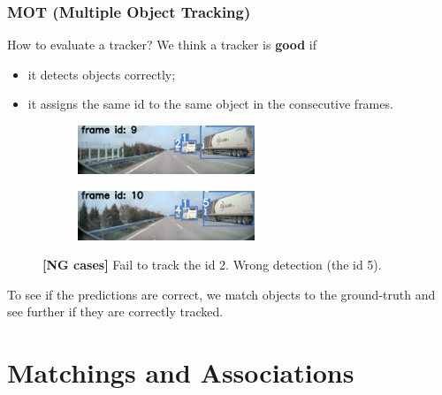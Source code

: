 \documentclass[slidetop, mathserif]{beamer}
\begin{document}
\begin{frame}
	\frametitle{MOT (Multiple Object Tracking)}

	How to evaluate a tracker? We think a tracker is {\bf good} if
	\begin{itemize}
	\item it detects objects correctly;
	\item
		it assigns the same id to the same object in the consecutive frames.
	\end{itemize}

	\vspace{-10pt}

	\begin{figure}
		\begin{subfigure}{.48\textwidth}
		\includegraphics[width=150pt]{pics/track03.jpg}
		\end{subfigure}
		\begin{subfigure}{.48\textwidth}
		\includegraphics[width=150pt]{pics/track04.jpg}
		\end{subfigure}
		\caption{{\color{red}\bf [NG cases]} Fail to track the id 2. Wrong detection (the id 5).}
	\end{figure}

	\vspace{-15pt}
	To see if the predictions are correct, we match objects to the ground-truth
	and see further if they are correctly tracked.

\end{frame}

\section{Matchings and Associations}
\end{document}
